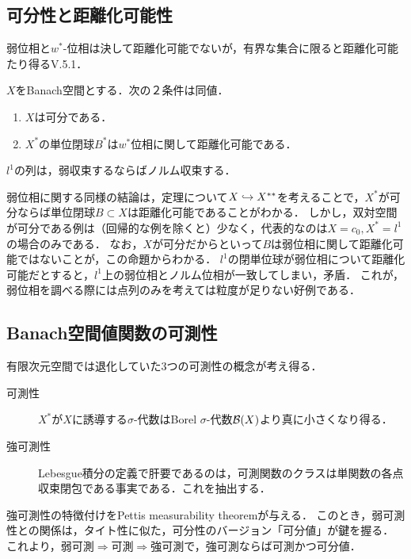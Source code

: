 \documentclass[uplatex,dvipdfmx]{jsreport}
\begin{document}
\subsection{可分性と距離化可能性}

\begin{tcolorbox}[colframe=ForestGreen, colback=ForestGreen!10!white,breakable,colbacktitle=ForestGreen!40!white,coltitle=black,fonttitle=\bfseries\sffamily,
title=]
    弱位相と$w^*$-位相は決して距離化可能でないが，有界な集合に限ると距離化可能たり得る\cite{John Conway}V.5.1．
\end{tcolorbox}

\begin{theorem}[単位閉球の距離化可能性]\label{thm-metrizability-of-ball}
    $X$をBanach空間とする．次の２条件は同値．
    \begin{enumerate}
        \item $X$は可分である．
        \item $X^*$の単位閉球$B^*$は$w^*$位相に関して距離化可能である．
    \end{enumerate}
\end{theorem}

\begin{proposition}
    $l^1$の列は，弱収束するならばノルム収束する．
\end{proposition}
\begin{remarks}
    弱位相に関する同様の結論は，定理について$X\hookrightarrow X^{**}$を考えることで，$X^*$が可分ならば単位閉球$B\subset X$は距離化可能であることがわかる．
    しかし，双対空間が可分である例は（回帰的な例を除くと）少なく，代表的なのは$X=c_0,X^*=l^1$の場合のみである．
    なお，$X$が可分だからといって$B$は弱位相に関して距離化可能ではないことが，この命題からわかる．
    $l^1$の閉単位球が弱位相について距離化可能だとすると，$l^1$上の弱位相とノルム位相が一致してしまい，矛盾．
    これが，弱位相を調べる際には点列のみを考えては粒度が足りない好例である．
\end{remarks}

\subsection{Banach空間値関数の可測性}

\begin{tcolorbox}[colframe=ForestGreen, colback=ForestGreen!10!white,breakable,colbacktitle=ForestGreen!40!white,coltitle=black,fonttitle=\bfseries\sffamily,
title=]
    有限次元空間では退化していた3つの可測性の概念が考え得る．
    \begin{description}
        \item[可測性] $X^*$が$X$に誘導する$\sigma$-代数はBorel $\sigma$-代数$\mathcal{B}(X)$より真に小さくなり得る．
        \item[強可測性] Lebesgue積分の定義で肝要であるのは，可測関数のクラスは単関数の各点収束閉包である事実である．これを抽出する．
    \end{description}
    強可測性の特徴付けをPettis measurability theoremが与える．
    このとき，弱可測性との関係は，タイト性に似た，可分性のバージョン「可分値」が鍵を握る．
    これより，弱可測$\Rightarrow$可測$\Rightarrow$強可測で，強可測ならば可測かつ可分値．
\end{tcolorbox}
\end{document}
